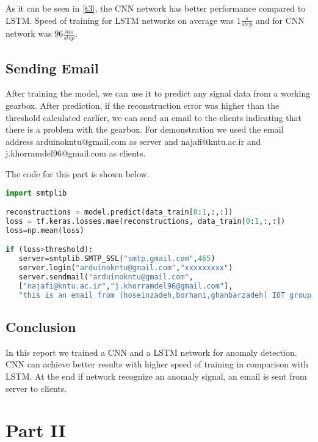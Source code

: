 As it can be seen in \ref{t3}, the CNN network has better performance compared to LSTM. Speed of training for LSTM networks on average was $1 \frac{s}{step}$ and for CNN network was $96 \frac{ms}{step}$.

\subsection*{Sending Email}

After training the model, we can use it to predict any signal data from a working gearbox. After prediction, if the reconstruction error was higher than the threshold calculated earlier, we can send an email to the clients indicating that there is a problem with the gearbox. 
For demonstration we used the email address arduinokntu@gmail.com as server and najafi@kntu.ac.ir and j.khorramdel96@gmail.com as clients.

The code for this part is shown below.

\begin{center}{\begin{minipage}{0.9\linewidth}
\begin{lstlisting}[language=Python, basicstyle=\fontsize{10}{10}\selectfont\ttfamily]
import smtplib

reconstructions = model.predict(data_train[0:1,:,:])
loss = tf.keras.losses.mae(reconstructions, data_train[0:1,:,:])
loss=np.mean(loss)

if (loss>threshold):
   server=smtplib.SMTP_SSL("smtp.gmail.com",465)
   server.login("arduinokntu@gmail.com","xxxxxxxxx")
   server.sendmail("arduinokntu@gmail.com", 
   ["najafi@kntu.ac.ir","j.khorramdel96@gmail.com"], 
   "this is an email from [hoseinzadeh,borhani,ghanbarzadeh] IOT group.")
\end{lstlisting}
\end{minipage}}\end{center}

\subsection*{Conclusion}

In this report we trained a CNN and a LSTM network for anomaly detection. CNN can achieve better results with higher speed of training in comparison with LSTM. At the end if network recognize an anomaly signal, an email is sent from server to clients.

\newpage
\section*{Part II}



